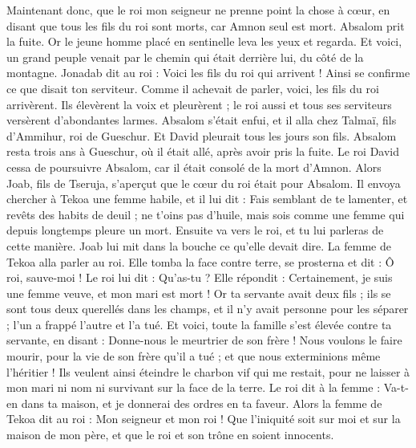 \begin{multicols}{2}
Maintenant donc, que le roi mon seigneur ne prenne point la chose à cœur, en disant que tous les fils du roi sont morts, car Amnon seul est mort.
Absalom prit la fuite. Or le jeune homme placé en sentinelle leva les yeux et regarda. Et voici, un grand peuple venait par le chemin qui était derrière lui, du côté de la montagne.
Jonadab dit au roi : Voici les fils du roi qui arrivent ! Ainsi se confirme ce que disait ton serviteur.
Comme il achevait de parler, voici, les fils du roi arrivèrent. Ils élevèrent la voix et pleurèrent ; le roi aussi et tous ses serviteurs versèrent d'abondantes larmes.
Absalom s'était enfui, et il alla chez Talmaï, fils d'Ammihur, roi de Gueschur. Et David pleurait tous les jours son fils.
Absalom resta trois ans à Gueschur, où il était allé, après avoir pris la fuite.
Le roi David cessa de poursuivre Absalom, car il était consolé de la mort d'Amnon.
\VerseOne{}Alors Joab, fils de Tseruja, s'aperçut que le cœur du roi était pour Absalom.
Il envoya chercher à Tekoa une femme habile, et il lui dit : Fais semblant de te lamenter, et revêts des habits de deuil ; ne t'oins pas d'huile, mais sois comme une femme qui depuis longtemps pleure un mort.
Ensuite va vers le roi, et tu lui parleras de cette manière. Joab lui mit dans la bouche ce qu'elle devait dire.
La femme de Tekoa alla parler au roi. Elle tomba la face contre terre, se prosterna et dit : Ô roi, sauve-moi !
Le roi lui dit : Qu'as-tu ? Elle répondit : Certainement, je suis une femme veuve, et mon mari est mort !
Or ta servante avait deux fils ; ils se sont tous deux querellés dans les champs, et il n'y avait personne pour les séparer ; l'un a frappé l'autre et l'a tué.
Et voici, toute la famille s'est élevée contre ta servante, en disant : Donne-nous le meurtrier de son frère ! Nous voulons le faire mourir, pour la vie de son frère qu'il a tué ; et que nous exterminions même l'héritier ! Ils veulent ainsi éteindre le charbon vif qui me restait, pour ne laisser à mon mari ni nom ni survivant sur la face de la terre.
Le roi dit à la femme : Va-t-en dans ta maison, et je donnerai des ordres en ta faveur.
Alors la femme de Tekoa dit au roi : Mon seigneur et mon roi ! Que l'iniquité soit sur moi et sur la maison de mon père, et que le roi et son trône en soient innocents.

\end{multicols}
